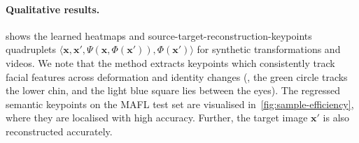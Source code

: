\documentclass{article}
\newcommand{\bx}{\mathbf{x}}
\begin{document}
\paragraph{Qualitative results.} shows the learned heatmaps and source-target-reconstruction-keypoints quadruplets $\langle\bx,\bx',\Psi\left(\bx,\Phi(\bx')\right),\Phi(\bx')\rangle$ for synthetic transformations and videos. We note that the method extracts keypoints which consistently track facial features across deformation and identity changes (\eg, the green circle tracks the lower chin, and the light blue square lies between the eyes). The regressed semantic keypoints on the MAFL test set are visualised in~\cref{fig:sample-efficiency}, where they are localised with high accuracy. Further, the target image $\bx'$ is also reconstructed accurately.
\end{document}
